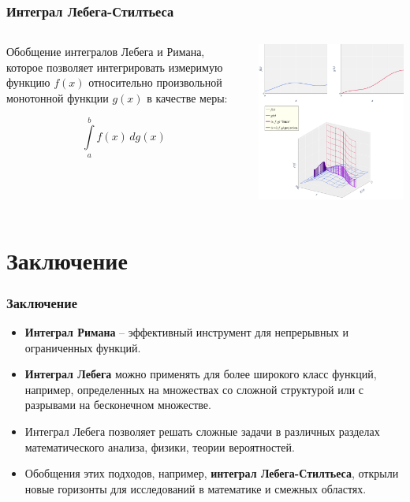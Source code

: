 \documentclass[aspectratio=169]{beamer}
\begin{document}
\begin{frame}
\frametitle{Интеграл Лебега-Стилтьеса}
\begin{columns}[c]
    \begin{column}{0.45\textwidth}
        Обобщение интегралов Лебега и Римана, которое позволяет интегрировать измеримую функцию $f(x)$ относительно произвольной монотонной функции $g(x)$ в качестве меры:

        $$
        \int\limits_a^b f(x) \, dg(x)
        $$
    \end{column}
    \begin{column}{0.45\textwidth}
        \includegraphics[width=\textwidth]{images/stieltjes_integral.png}
    \end{column}
\end{columns}
\end{frame}

\section*{Заключение}

\begin{frame}
\frametitle{Заключение}
\begin{itemize}
    \item \textbf{Интеграл Римана} -- эффективный инструмент для непрерывных и ограниченных функций.
    \item \textbf{Интеграл Лебега} можно применять для более широкого класс функций, например, определенных на множествах со сложной структурой или с разрывами на бесконечном множестве.
    \item Интеграл Лебега позволяет решать сложные задачи в различных разделах математического анализа, физики, теории вероятностей.
    \item Обобщения этих подходов, например, \textbf{интеграл Лебега-Стилтьеса}, открыли новые горизонты для исследований в математике и смежных областях.
\end{itemize}
\end{frame}
\end{document}
